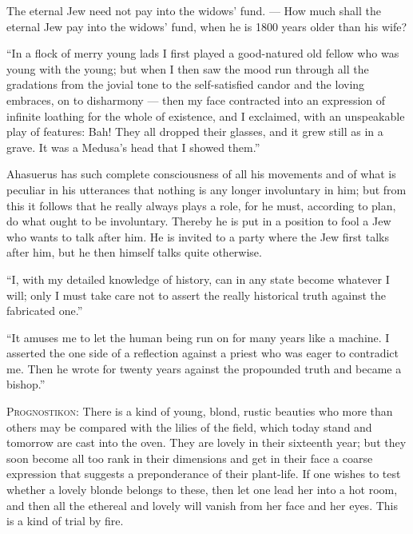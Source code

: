 \documentclass[12pt,a4paper]{article}
\newcommand{\opage}[1]{\marginnote{\footnotesize\textit{[#1]}}}
\newcommand{\aphsep}{\par\smallskip\centerline{\textasteriskcentered}\smallskip}
\begin{document}
The eternal Jew need not pay into the widows' fund. --- How much shall the eternal
Jew pay into the widows' fund, when he is 1800 years older than his wife?

\aphsep

\opage{56}``In a flock of merry young lads I first played a good-natured old fellow
who was young with the young; but when I then saw the mood run through all the
gradations from the jovial tone to the self-satisfied candor and the loving
embraces, on to disharmony --- then my face contracted into an expression of
infinite loathing for the whole of existence, and I exclaimed, with an unspeakable
play of features: Bah! They all dropped their glasses, and it grew still as in a
grave. It was a Medusa's head that I showed them.''

\aphsep

Ahasuerus has such complete consciousness of all his movements and of what is
peculiar in his utterances that nothing is any longer involuntary in him; but from
this it follows that he really always plays a role, for he must, according to plan,
do what ought to be involuntary. Thereby he is put in a position to fool a Jew who
wants to talk after him. He is invited to a party where the Jew first talks after
him, but he then himself talks quite otherwise.

\aphsep

``I, with my detailed knowledge of history, can in any state become whatever I
will; only I must take care not to assert the really historical truth against the
fabricated one.''

\aphsep

``It amuses me to let the human being run on for many years like a machine. I
asserted the one side of a reflection against a priest who was eager to contradict
me. Then he wrote for twenty years against the propounded truth and became a
bishop.''

\aphsep

\textsc{Prognostikon}: There is a kind of young, blond, rustic beauties who more
than others may be compared \opage{57}with the lilies of the field, which today
stand and tomorrow are cast into the oven. They are lovely in their sixteenth year;
but they soon become all too rank in their dimensions and get in their face a
coarse expression that suggests a preponderance of their plant-life. If one wishes
to test whether a lovely blonde belongs to these, then let one lead her into a hot
room, and then all the ethereal and lovely will vanish from her face and her eyes.
This is a kind of trial by fire.
\end{document}

